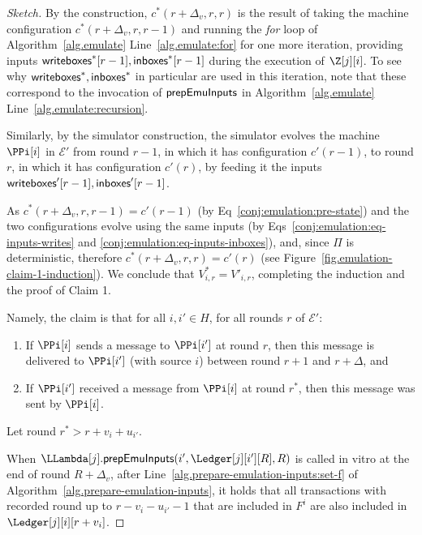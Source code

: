 \begin{proof}[Sketch]
  By the \rollerblade construction,
  $c^*(r + \Delta_v, r, r)$ is the result of
  taking the machine configuration
  $c^*(r + \Delta_v, r, r - 1)$
  and running the \emph{for} loop of Algorithm~\ref{alg.emulate} Line~\ref{alg.emulate:for}
  for one more iteration, providing inputs $\textsf{writeboxes}^*[r - 1], \textsf{inboxes}^*[r - 1]$
  during the execution of $\Z[j][i]$.
  To see why $\textsf{writeboxes}^*, \textsf{inboxes}^*$ in particular are used in this iteration,
  note that these correspond to the invocation of $\textsf{prepEmuInputs}$ in
  Algorithm~\ref{alg.emulate} Line~\ref{alg.emulate:recursion}.

  Similarly, by the simulator construction, %
  the simulator evolves the machine $\PPi[i]$ in $\mathcal{E}'$ from round $r - 1$,
  in which it has configuration $c'(r - 1)$,
  to round $r$,
  in which it has configuration $c'(r)$,
  by feeding it the inputs $\textsf{writeboxes}'[r - 1], \textsf{inboxes}'[r - 1]$.

  As $c^*(r + \Delta_v, r, r - 1) = c'(r - 1)$ (by Eq~\ref{conj:emulation:pre-state})
  and the two configurations evolve using the same inputs (by
  Eqs~\ref{conj:emulation:eq-inputs-writes} and \ref{conj:emulation:eq-inputs-inboxes}),
  and, since $\Pi$ is deterministic,
  therefore $c^*(r + \Delta_v, r, r) = c'(r)$ (see Figure~\ref{fig.emulation-claim-1-induction}).
  We conclude that $V^*_{i,r} = V'_{i,r}$, completing the induction
  and the proof of Claim 1.

  Namely, the claim is that for all $i, i' \in H$, for all rounds $r$ of $\mathcal{E}'$:

  \begin{enumerate}[label=(\alph*)]
    \item
    \label{conj:emulation:claim-delta-a}
    If $\PPi[i]$ sends a message to $\PPi[i']$ at round $r$, then this message is delivered to $\PPi[i']$
    (with source $i$) between round $r + 1$ and $r + \Delta$, and

    \item
    \label{conj:emulation:claim-delta-b}
    If $\PPi[i']$ received a message from $\PPi[i]$ at round $r^*$, then this message was sent by $\PPi[i]$.
  \end{enumerate}

  Let round $r^* > r + v_i + u_{i'}$.

  When $\LLambda[j].\prepareEmulationInputs(i', \Ledger[j][i'][R], R)$ is called in vitro
  at the end of round $R + \Delta_v$, after Line~\ref{alg.prepare-emulation-inputs:set-f} of Algorithm~\ref{alg.prepare-emulation-inputs},
  it holds that all transactions with recorded round up to $r - v_i - u_{i'} - 1$ that are included in $F^{i}$ are also included in $\Ledger[j][i][r + v_i]$.



\end{proof}
